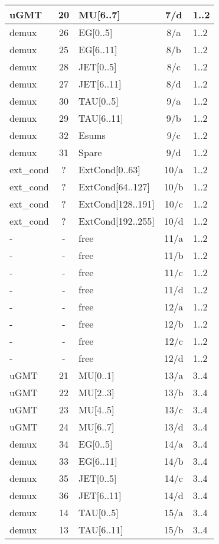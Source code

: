 \begin{longtable}{|l|c|l|c|l|}
uGMT  & 20  & MU[6..7]   & 7/d  & 1..2 \\\hline
demux & 26  & EG[0..5]   & 8/a  & 1..2 \\\hline
demux & 25  & EG[6..11]  & 8/b  & 1..2 \\\hline
demux & 28  & JET[0..5]  & 8/c  & 1..2 \\\hline
demux & 27  & JET[6..11] & 8/d  & 1..2 \\\hline
demux & 30  & TAU[0..5]  & 9/a  & 1..2 \\\hline
demux & 29  & TAU[6..11] & 9/b  & 1..2 \\\hline
demux & 32  & Esums      & 9/c  & 1..2 \\\hline
demux & 31  & Spare      & 9/d  & 1..2 \\\hline
ext\_cond & ?   & ExtCond[0..63]    & 10/a & 1..2 \\\hline
ext\_cond & ?   & ExtCond[64..127]  & 10/b & 1..2 \\\hline
ext\_cond & ?   & ExtCond[128..191] & 10/c & 1..2 \\\hline
ext\_cond & ?   & ExtCond[192..255] & 10/d & 1..2 \\\hline
- & - & free & 11/a & 1..2 \\\hline
- & - & free & 11/b & 1..2 \\\hline
- & - & free & 11/c & 1..2 \\\hline
- & - & free & 11/d & 1..2 \\\hline
- & - & free & 12/a & 1..2 \\\hline
- & - & free & 12/b & 1..2 \\\hline
- & - & free & 12/c & 1..2 \\\hline
- & - & free & 12/d & 1..2 \\\hline
\hline
uGMT  & 21  & MU[0..1]   & 13/a & 3..4 \\\hline
uGMT  & 22  & MU[2..3]   & 13/b & 3..4 \\\hline
uGMT  & 23  & MU[4..5]   & 13/c & 3..4 \\\hline
uGMT  & 24  & MU[6..7]   & 13/d & 3..4 \\\hline
demux & 34  & EG[0..5]   & 14/a & 3..4 \\\hline
demux & 33  & EG[6..11]  & 14/b & 3..4 \\\hline
demux & 35  & JET[0..5]  & 14/c & 3..4 \\\hline
demux & 36  & JET[6..11] & 14/d & 3..4 \\\hline
demux & 14  & TAU[0..5]  & 15/a & 3..4 \\\hline
demux & 13  & TAU[6..11] & 15/b & 3..4 \\\hline

\end{longtable}
